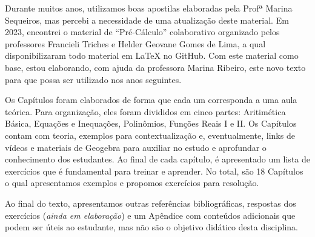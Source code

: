 Durante muitos anos, utilizamos boas apostilas elaboradas pela Profª Marina Sequeiros, mas percebi a necessidade de uma atualização deste material. Em 2023, encontrei o material de ``Pré-Cálculo'' colaborativo organizado pelos professores Francieli Triches e Helder Geovane Gomes de Lima, a qual disponibilizaram todo material em LaTeX no GitHub. Com este material como base, estou elaborando, com ajuda da professora Marina Ribeiro, este novo texto para que possa ser utilizado nos anos seguintes.

Os Capítulos foram elaborados de forma que cada um corresponda a uma aula teórica.
Para organização, eles foram divididos em cinco partes: Aritimética Básica, Equações e Inequações, Polinômios, Funções Reais I e II. 
Os Capítulos contam com teoria, exemplos para contextualização e, eventualmente, links de vídeos e materiais de Geogebra para auxiliar no estudo e aprofundar o conhecimento dos estudantes. Ao final de cada capítulo, é apresentado um lista de exercícios que é fundamental para treinar e aprender.
No total, são 18 Capítulos o qual apresentamos  exemplos e propomos  exercícios para resolução.

Ao final do texto, apresentamos outras referências bibliográficas, respostas dos exercícios (\textit{ainda em elaboração}) e um Apêndice com conteúdos adicionais que podem ser úteis ao estudante, mas não são o objetivo didático desta disciplina.

\setcounter{tocdepth}{0}
\tableofcontents %